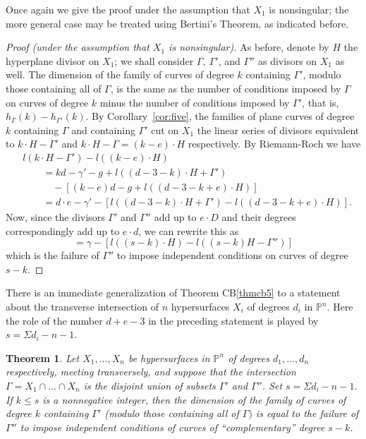 \documentclass{bull-l}
\theoremstyle{pplain}
\newtheorem{thmcb}{Theorem}
\theoremstyle{definition}
\begin{document}
Once again we give the proof under the assumption that $X_1$ is nonsingular;
the more general case may be treated using Bertini's Theorem, as indicated
before.

\begin{proof}[Proof \rm (under the assumption that $X_1$ is nonsingular)]
As before, denote by $H$ the hyperplane divisor on $X_1$; we shall consider $
\Gamma,\ \Gamma'$, and $\Gamma''$ as divisors on $X_1$ as well.   The dimension
of the family of curves of degree $k$ containing $\Gamma'$, modulo those
containing all of $\Gamma$, is the same as the number of conditions imposed by
$\Gamma$ on curves of degree $k$ minus the number of conditions imposed by $
\Gamma'$, that is, $h_\Gamma(k)-h_{\Gamma'}(k)$.  By
Corollary~\ref{cor:five}, the families of plane curves of degree $k$
containing $\Gamma$ and containing  $\Gamma'$ cut on $X_1$ the linear series of
divisors equivalent to $k\cdot H-\Gamma'$ and $k\cdot H-\Gamma=(k-e)\cdot H$
respectively.   By Riemann-Roch we have
\begin{equation*} 
\begin{split}
&l(k\cdot H-\Gamma')-l((k-e)\cdot H)\\
&\qquad =kd-\gamma'-g+l((d-3-k)\cdot H+\Gamma')\\
&\qquad \quad -[(k-e)d-g+l((d-3-k+e)\cdot H)]\\
&\qquad =d\cdot e-\gamma'-[l((d-3-k)\cdot H+\Gamma')-l((d-3-k+e)\cdot H)].
\end{split}
\end{equation*}
Now, since the divisors $\Gamma'$ and $\Gamma''$ add up to $e\cdot D$ and their
degrees  correspondingly add up to $e\cdot d$, we can rewrite this as
\[=\gamma-[l((s-k)\cdot H)-l((s-k)H-\Gamma'')]\]
which is the failure of $\Gamma''$ to impose independent conditions on curves
of degree $s-k$.
\end{proof}

There is an immediate generalization of Theorem CB\ref{thmcb5} to a statement
about the transverse intersection of $n$ hypersurfaces $X_i$ of degrees $d_i$
in $\mathbb{P}^n$.  Here the role of the number $d+e-3$ in the preceding
statement is played by $s=\Sigma d_i-n-1$.

\begin{thmcb} \label{thmcb6}
Let $X_1,\dots, X_n$ be hypersurfaces in $\mathbb{P}^n$ of degrees
$d_1,\dots,d_n$ respectively, meeting transversely, and suppose that the
intersection $\Gamma=X_1\cap \dots \cap X_n$ is the disjoint union of subsets $
\Gamma'$ and $\Gamma''$.  Set $s=\Sigma d_i-n-1$.  If $k\le s$ is a nonnegative
integer, then the dimension of the family of curves of degree $k$ containing $
\Gamma'$ \textup{(}modulo those containing all of $\Gamma)$ is equal to the
failure of $\Gamma''$ to impose independent conditions of curves of
\textup{``}complementary\textup{''} degree $s-k$.
\end{thmcb}
\end{document}
